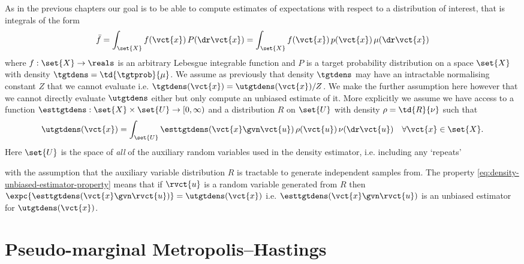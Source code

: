 As in the previous chapters our goal is to be able to compute estimates of expectations with respect to a distribution of interest, that is integrals of the form
\begin{equation}
  \bar{f} = \int_{\set{X}} f(\vct{x})\,P(\dr \vct{x}) = \int_{\set{X}} f(\vct{x})\,p(\vct{x})\,\mu(\dr\vct{x})
\end{equation}
where $f : \set{X} \to \reals$ is an arbitrary Lebesgue integrable function and $P$ is a target probability distribution on a space $\set{X}$ with density $\tgtdens = \td{\tgtprob}{\mu}$. We assume as previously that density $\tgtdens$ may have an intractable normalising constant $Z$ that we cannot evaluate i.e. $\tgtdens(\vct{x}) = \utgtdens(\vct{x}) / Z$. We make the further assumption here however that we cannot directly evaluate $\utgtdens$ either but only compute an unbiased estimate of it. More explicitly we assume we have access to a function $\esttgtdens : \set{X} \times \set{U} \to [0,\infty)$ and a distribution $R$ on $\set{U}$ with density $\rho = \td{R}{\nu}$ such that
\begin{equation}\label{eq:density-unbiased-estimator-property}
  \utgtdens(\vct{x}) = \int_{\set{U}} \esttgtdens(\vct{x}\gvn\vct{u})\,\rho(\vct{u})\,\nu(\dr\vct{u})
  \quad \forall \vct{x} \in \set{X}.
\end{equation}
Here $\set{U}$ is the space of \emph{all} of the auxiliary random variables used in the density estimator, i.e. including any `repeats' 

 with the assumption that the auxiliary variable distribution $R$ is tractable to generate independent samples from. The property \eqref{eq:density-unbiased-estimator-property} means that if $\rvct{u}$ is a random variable generated from $R$ then $\expc{\esttgtdens(\vct{x}\gvn\rvct{u})} = \utgtdens(\vct{x})$ i.e. $\esttgtdens(\vct{x}\gvn\rvct{u})$ is an unbiased estimator for $\utgtdens(\vct{x})$.

\section{Pseudo-marginal Metropolis--Hastings}

